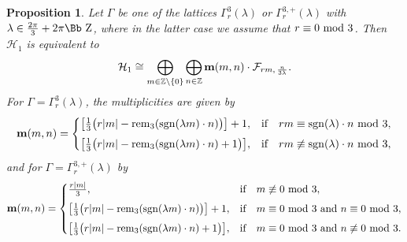 \documentclass[pdftex]{sigma}
\newcommand\ZZ{{\mbox{\Bb Z}}}
\newcommand\Z{{\mathbb Z}}
\newcommand\bm{\textbf{{\rm \textbf{m}}}}
\newcommand\cH{{\mathcal H}}
\newcommand\cF{{\mathcal F}}
\newcommand{\sgn}{\mathop{{\rm sgn}}}
\newcommand{\rem}{\mathop{{\rm rem}}}
\numberwithin{equation}{section}
\newtheorem{Proposition}[Theorem]{Proposition}
 { \theoremstyle{definition}
\newtheorem{Definition}[Theorem]{Definition}
\newtheorem{Note}[Theorem]{Note}
\newtheorem{Example}[Theorem]{Example}
\newtheorem{Remark}[Theorem]{Remark} }
\begin{document}
\begin{Proposition} \label{Pord3} Let $\Gamma$ be one of the lattices $\Gamma_r^3(\lambda)$ or $\Gamma_r^{3,+}(\lambda)$ with $\lambda\in\frac{2\pi}3+2\pi\ZZ$, where in the latter case we assume that $r\equiv 0\ {\rm mod}\ 3$. Then $\cH_1$ is equivalent to
\begin{gather*}
\cH_1\cong\bigoplus_{m\in \Z\backslash\{0\}} \bigoplus_{n\in\Z} \bm(m,n)\cdot \cF_{rm,\,\frac n{3\lambda}}.
\end{gather*}
For $\Gamma=\Gamma_r^3(\lambda)$, the multiplicities are given by
\begin{gather*}
\bm(m,n) =\begin{cases}
\big[\frac13 \big({r|m|-\rem_3(\sgn(\lambda m)\cdot n)\big)}\big]+1,
& \text{if\quad $rm \equiv \sgn(\lambda)\cdot n$ {\rm mod}}\ 3,
\\[1ex]
\big[\frac13\big(r|m|-\rem_3(\sgn(\lambda m)\cdot n)+1\big)\big],
& \text{if\quad $rm\not\equiv \sgn(\lambda)\cdot n$ {\rm mod} $3$},
\end{cases}
\end{gather*}
and for $\Gamma=\Gamma_r^{3,+}(\lambda)$ by
\begin{gather*}
\bm(m,n) =
\begin{cases}
\frac{r|m|}{3},&\text{if\quad $m\not\equiv 0$ {\rm mod} $3$},
\\[1ex]
\big[\frac13\big(r|m|-\rem_3(\sgn(\lambda m)\cdot n)\big)\big]+1,
& \text{if\quad $m \equiv 0$ {\rm mod 3} and $n\equiv 0$ \rm{mod 3}},
\\[1ex]
\big[\frac13\big(r|m|-\rem_3(\sgn(\lambda m)\cdot n)+1\big)\big],
&\text{if\quad $m \equiv 0$ {\rm mod 3} and $n\not \equiv 0$ \rm{mod 3}}.
\end{cases}
\end{gather*}
\end{Proposition}
\end{document}
